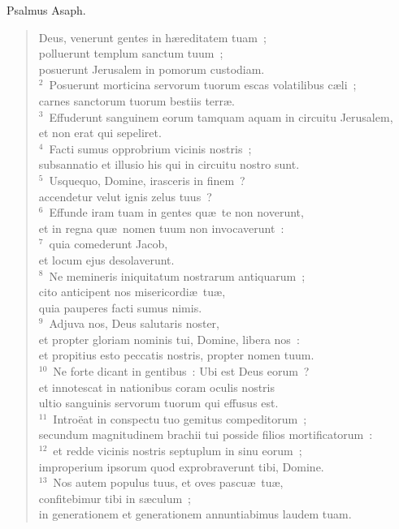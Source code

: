 \bchapter
\lettrine[lines=3,image=true,loversize=0.05,lraise=-0.03]{P}{}salmus Asaph. \begin{flushleft}\begin{verse}\vspace{6pt}Deus, venerunt gentes in h\ae reditatem tuam~;\\ polluerunt templum sanctum tuum~;\\ posuerunt Jerusalem in pomorum custodiam.\\
${}^{2}$~Posuerunt morticina servorum tuorum escas volatilibus c\ae li~;\\ carnes sanctorum tuorum bestiis terr\ae .\\
${}^{3}$~Effuderunt sanguinem eorum tamquam aquam in circuitu Jerusalem,\\ et non erat qui sepeliret.\\
${}^{4}$~Facti sumus opprobrium vicinis nostris~;\\ subsannatio et illusio his qui in circuitu nostro sunt.\\
${}^{5}$~Usquequo, Domine, irasceris in finem~?\\ accendetur velut ignis zelus tuus~?\\
${}^{6}$~Effunde iram tuam in gentes qu\ae\ te non noverunt,\\ et in regna qu\ae\ nomen tuum non invocaverunt~:\\
${}^{7}$~quia comederunt Jacob,\\ et locum ejus desolaverunt.\\
${}^{8}$~Ne memineris iniquitatum nostrarum antiquarum~;\\ cito anticipent nos misericordi\ae\ tu\ae ,\\ quia pauperes facti sumus nimis.\\
${}^{9}$~Adjuva nos, Deus salutaris noster,\\ et propter gloriam nominis tui, Domine, libera nos~:\\ et propitius esto peccatis nostris, propter nomen tuum.\\
${}^{10}$~Ne forte dicant in gentibus~: Ubi est Deus eorum~?\\ et innotescat in nationibus coram oculis nostris\\ ultio sanguinis servorum tuorum qui effusus est.\\
${}^{11}$~Intro\"eat in conspectu tuo gemitus compeditorum~;\\ secundum magnitudinem brachii tui posside filios mortificatorum~:\\
${}^{12}$~et redde vicinis nostris septuplum in sinu eorum~;\\ improperium ipsorum quod exprobraverunt tibi, Domine.\\
${}^{13}$~Nos autem populus tuus, et oves pascu\ae\ tu\ae ,\\ confitebimur tibi in s\ae culum~;\\ in generationem et generationem annuntiabimus laudem tuam.\end{verse}\end{flushleft}



